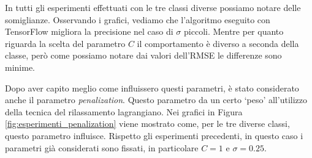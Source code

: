 \documentclass[a4paper,12pt]{report}
\begin{document}
\noindent In tutti gli esperimenti effettuati con le tre classi diverse possiamo notare delle somiglianze. Osservando i grafici, vediamo che l'algoritmo eseguito con TensorFlow migliora la precisione nel caso di $\sigma$ piccoli. Mentre per quanto riguarda la scelta del parametro $C$ il comportamento è diverso a seconda della classe, però come possiamo notare dai valori dell'RMSE le differenze sono minime.


Dopo aver capito meglio come influissero questi parametri, è stato considerato anche il parametro \textit{penalization}. Questo parametro da un certo `peso' all'utilizzo della tecnica del rilassamento lagrangiano. Nei grafici in Figura \ref{fig:esperimenti_penalization} viene mostrato come, per le tre diverse classi, questo parametro influisce. Rispetto gli esperimenti precedenti, in questo caso i parametri già considerati sono fissati, in particolare $C=1$ e $\sigma=0.25$. 
\end{document}
